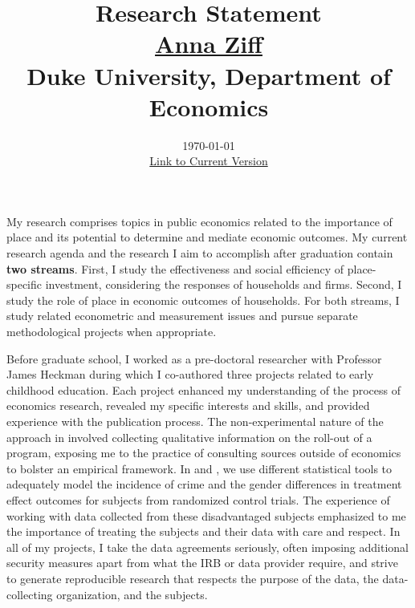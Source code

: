 

\setlength{\parskip}{\baselineskip}%
\setlength{\parindent}{0pt}%
\setlength{\droptitle}{-5em}



\title{\normalsize \textbf{Research Statement} \\ \href{https://aziff.github.io}{Anna Ziff} \\ Duke University, Department of Economics}
\date{\vspace{-2.25cm} \normalsize \today \\ \href{https://www.dropbox.com/scl/fi/cpkgsn0q5n055d53jussa/AnnaZiff_ResearchStatement.pdf?rlkey=ylj2w4sumidwasqk08gfi3p7t&dl=0}{Link to Current Version}}
\maketitle

My research comprises topics in public economics related to the importance of place and its potential to determine and mediate economic outcomes. My current research agenda and the research I aim to accomplish after graduation contain \textbf{two streams}. First, I study the effectiveness and social efficiency of place-specific investment, considering the responses of households and firms. Second, I study the role of place in economic outcomes of households. For both streams, I study related econometric and measurement issues and pursue separate methodological projects when appropriate.

Before graduate school, I worked as a pre-doctoral researcher with Professor James Heckman during which I co-authored three projects related to early childhood education. Each project enhanced my understanding of the process of economics research, revealed my specific interests and skills, and provided experience with the publication process. The non-experimental nature of the approach in \citet{biroli_evaluation_2018} involved collecting qualitative information on the roll-out of a program, exposing me to the practice of consulting sources outside of economics to bolster an empirical framework. In \citet{garcia_gender_2018} and \citet{garcia_early_2019}, we use different statistical tools to adequately model the incidence of crime and the gender differences in treatment effect outcomes for subjects from randomized control trials. The experience of working with data collected from these disadvantaged subjects emphasized to me the importance of treating the subjects and their data with care and respect. In all of my projects, I take the data agreements seriously, often imposing additional security measures apart from what the IRB or data provider require, and strive to generate reproducible research that respects the purpose of the data, the data-collecting organization, and the subjects.

